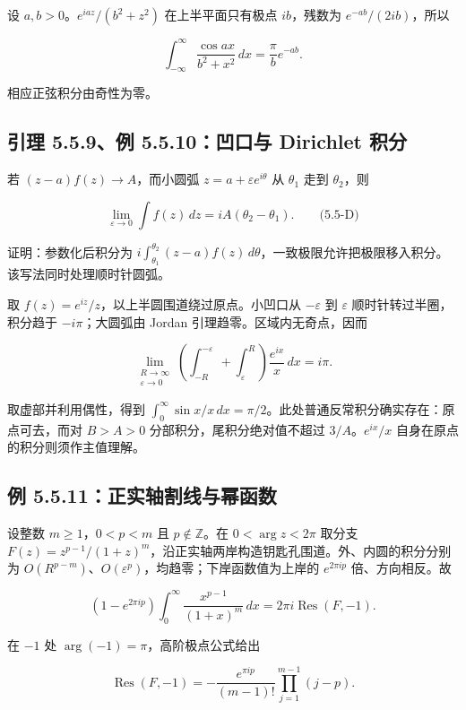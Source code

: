 \documentclass[11pt,a4paper]{article}
\begin{document}
设 \(a,b>0\)。\(e^{iaz}/(b^2+z^2)\) 在上半平面只有极点 \(ib\)，残数为
\(e^{-ab}/(2ib)\)，所以

\[
\int_{-\infty}^{\infty}\frac{\cos ax}{b^2+x^2}\,dx
=\frac{\pi}{b}e^{-ab}.
\]

相应正弦积分由奇性为零。

\subsection{引理 5.5.9、例 5.5.10：凹口与 Dirichlet
积分}\label{ch05-s5-heading-6}

若 \((z-a)f(z)\to A\)，而小圆弧 \(z=a+\varepsilon e^{i\theta}\) 从
\(\theta_1\) 走到 \(\theta_2\)，则

\[
\lim_{\varepsilon\to0}\int f(z)\,dz=iA(\theta_2-\theta_1).
\qquad\text{(5.5-D)}
\]

证明：参数化后积分为
\(i\int_{\theta_1}^{\theta_2}(z-a)f(z)\,d\theta\)，一致极限允许把极限移入积分。该写法同时处理顺时针圆弧。

取 \(f(z)=e^{iz}/z\)，以上半圆围道绕过原点。小凹口从 \(-\varepsilon\) 到
\(\varepsilon\) 顺时针转过半圈，积分趋于 \(-i\pi\)；大圆弧由 Jordan
引理趋零。区域内无奇点，因而

\[
\lim_{\substack{R\to\infty\\\varepsilon\to0}}
\left(\int_{-R}^{-\varepsilon}+\int_\varepsilon^R\right)\frac{e^{ix}}x\,dx=i\pi.
\]

取虚部并利用偶性，得到
\(\int_0^\infty\sin x/x\,dx=\pi/2\)。此处普通反常积分确实存在：原点可去，而对
\(B>A>0\) 分部积分，尾积分绝对值不超过 \(3/A\)。\(e^{ix}/x\)
自身在原点的积分则须作主值理解。

\subsection{例 5.5.11：正实轴割线与幂函数}\label{ch05-s5-heading-7}

设整数 \(m\ge1\)，\(0<p<m\) 且 \(p\notin\mathbb Z\)。在
\(0<\arg z<2\pi\) 取分支
\(F(z)=z^{p-1}/(1+z)^m\)，沿正实轴两岸构造钥匙孔围道。外、内圆的积分分别为
\(O(R^{p-m})\)、\(O(\varepsilon^p)\)，均趋零；下岸函数值为上岸的
\(e^{2\pi ip}\) 倍、方向相反。故

\[
(1-e^{2\pi ip})\int_0^\infty\frac{x^{p-1}}{(1+x)^m}\,dx
=2\pi i\operatorname{Res}(F,-1).
\]

在 \(-1\) 处 \(\arg(-1)=\pi\)，高阶极点公式给出

\[
\operatorname{Res}(F,-1)
=-\frac{e^{\pi ip}}{(m-1)!}\prod_{j=1}^{m-1}(j-p).
\]
\end{document}

